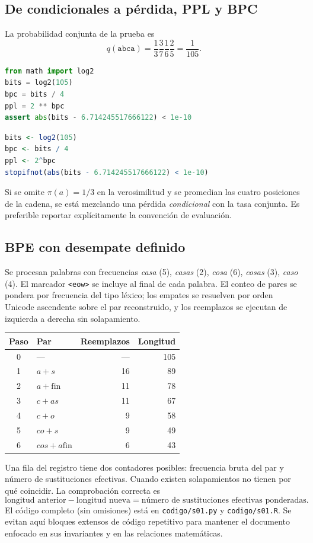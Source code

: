 \subsection{De condicionales a pérdida, PPL y BPC}
La probabilidad conjunta de la prueba es
\[
q(\texttt{abca})=\frac13\frac37\frac16\frac25=\frac1{105}.
\]
\begin{lstlisting}[language=Python]
from math import log2
bits = log2(105)
bpc = bits / 4
ppl = 2 ** bpc
assert abs(bits - 6.714245517666122) < 1e-10
\end{lstlisting}
\begin{lstlisting}[language=R]
bits <- log2(105)
bpc <- bits / 4
ppl <- 2^bpc
stopifnot(abs(bits - 6.714245517666122) < 1e-10)
\end{lstlisting}
Si se omite $\pi(a)=1/3$ en la verosimilitud y se promedian las
cuatro posiciones de la cadena, se está mezclando una pérdida
\emph{condicional} con la tasa conjunta. Es preferible reportar
explícitamente la convención de evaluación.
\subsection{BPE con desempate definido}
Se procesan palabras con frecuencias
\emph{casa} (5), \emph{casas} (2), \emph{cosa} (6),
\emph{cosas} (3), \emph{caso} (4).
El marcador \texttt{<eow>} se incluye al final de cada palabra.
El conteo de pares se pondera por frecuencia del tipo léxico;
los empates se resuelven por orden Unicode ascendente sobre el par
reconstruido, y los reemplazos se ejecutan de izquierda a derecha
sin solapamiento.
\begin{center}\small
\begin{tabular}{clrr}\toprule Paso & Par & Reemplazos & Longitud\\\midrule
0&---&---&105\\1&$a+s$&16&89\\2&$a+\mathrm{fin}$&11&78\\
3&$c+as$&11&67\\4&$c+o$&9&58\\5&$co+s$&9&49\\
6&$cos+a\mathrm{fin}$&6&43\\\bottomrule
\end{tabular}
\end{center}
Una fila del registro tiene dos contadores posibles: frecuencia bruta
del par y número de sustituciones efectivas. Cuando existen
solapamientos no tienen por qué coincidir. La comprobación correcta es
\[
\text{longitud anterior}-\text{longitud nueva}
=\text{número de sustituciones efectivas ponderadas}.
\]
El código completo (sin omisiones) está en
\texttt{codigo/s01.py} y \texttt{codigo/s01.R}. Se evitan aquí bloques
extensos de código repetitivo para mantener el documento enfocado en
sus invariantes y en las relaciones matemáticas.
